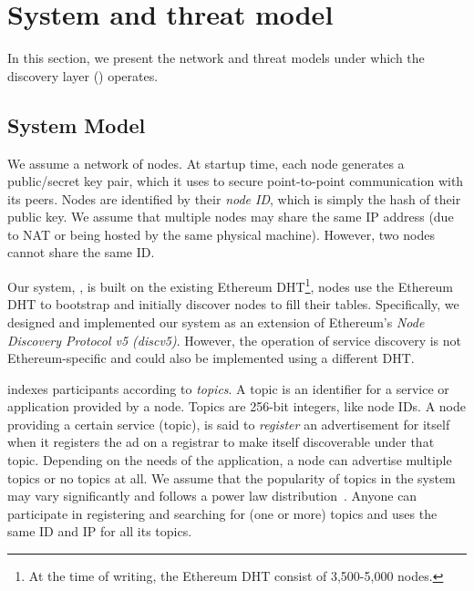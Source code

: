 
\section{System and threat model}
\label{sec:model}

In this section, we present the network and threat models under which the \sysname discovery layer () operates. 

\subsection{System Model}
We assume a network of nodes. At startup time, each node generates a public/secret key pair, which it uses to secure point-to-point communication with its peers. Nodes are identified by their \emph{node ID}, which is simply the hash of their public key. We assume that multiple nodes may share the same IP address (due to NAT or being hosted by the same physical machine). However, two nodes cannot share the same ID.

Our system, \sysname, is built on the existing Ethereum DHT\footnote{At the time of writing, the Ethereum DHT consist of 3,500-5,000 nodes.}, \ie nodes use the Ethereum DHT to bootstrap and initially discover nodes to fill their tables. Specifically, we designed and implemented our system as an extension of Ethereum's \emph{Node Discovery Protocol v5 (discv5)}. However, the operation of service discovery is not Ethereum-specific and could also be implemented using a different DHT.

\sysname indexes participants according to \emph{topics}. A topic is an identifier for a
service or application provided by a node. Topics are 256-bit integers, like node IDs.
A node providing a certain service (topic), is said to \emph{register} an advertisement for itself when it registers the ad on a registrar to make itself discoverable under that topic. Depending on the needs of the application, a node can advertise multiple topics or no topics at all. We assume that the popularity of topics in the system may vary significantly and follows a power law distribution~\cite{kim2018measuring}. Anyone can participate in registering and searching for (one or more) topics and uses the same ID and IP for all its topics.


